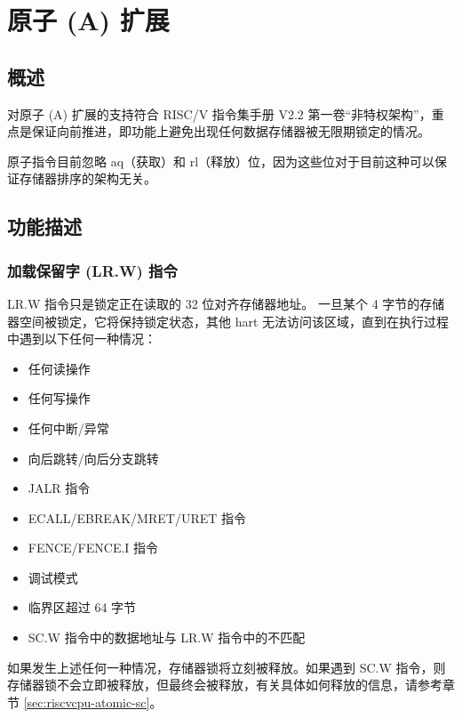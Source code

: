 \documentclass[main\_\_CN.tex]{subfiles}
\begin{document}
\clearpage
\section{原子 (A) 扩展}
\label{sec:riscvcpu-atomic}

\subsection{概述}
\label{sec:riscvcpu-atomic-overview}

对原子 (A) 扩展的支持符合 RISC\-/V 指令集手册 V2.2 第一卷“非特权架构”，重点是保证向前推进，即功能上避免出现任何数据存储器被无限期锁定的情况。

原子指令目前忽略 aq（获取）和 rl（释放）位，因为这些位对于目前这种可以保证存储器排序的架构无关。

\subsection{功能描述}
\label{sec:riscvcpu-atomic-func-descr}

\subsubsection{加载保留字 (LR.W) 指令}
\label{sec:riscvcpu-atomic-lr}

LR.W 指令只是锁定正在读取的 32 位对齐存储器地址。 一旦某个 4 字节的存储器空间被锁定，它将保持锁定状态，其他 hart 无法访问该区域，直到在执行过程中遇到以下任何一种情况：

\begin{itemize}
     \item 任何读操作
     \item 任何写操作
     \item 任何中断/异常
     \item 向后跳转/向后分支跳转
     \item JALR 指令
     \item ECALL/EBREAK/MRET/URET 指令
     \item FENCE/FENCE.I 指令
     \item 调试模式
     \item 临界区超过 64 字节
     \item SC.W 指令中的数据地址与 LR.W 指令中的不匹配
\end{itemize}

如果发生上述任何一种情况，存储器锁将立刻被释放。如果遇到 SC.W 指令，则存储器锁不会立即被释放，但最终会被释放，有关具体如何释放的信息，请参考章节 \ref{sec:riscvcpu-atomic-sc}。
\end{document}
